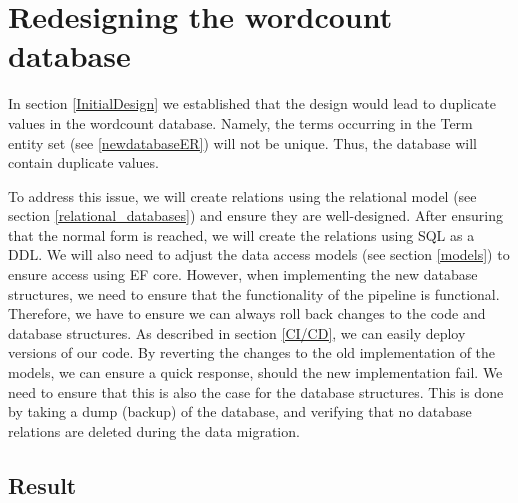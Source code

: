\section{Redesigning the wordcount database}
In section \ref{InitialDesign} we established that the design would lead to duplicate values in the wordcount database.
Namely, the terms occurring in the Term entity set (see \ref{newdatabaseER}) will not be unique. 
Thus, the database will contain duplicate values.
 
To address this issue, we will create relations using the relational model (see section \ref{relational_databases}) and ensure they are well-designed.
After ensuring that the normal form is reached, we will create the relations using SQL as a DDL.
We will also need to adjust the data access models (see section \ref{models}) to ensure access using EF core. However, when implementing the new database structures, we need to ensure that the functionality of the pipeline is functional. 
Therefore, we have to ensure we can always roll back changes to the code and database structures.
As described in section \ref{CI/CD}, we can easily deploy versions of our code. By reverting the changes to the old implementation of the models, we can ensure a quick response, should the new implementation fail.
We need to ensure that this is also the case for the database structures. 
This is done by taking a dump (backup) of the database, and verifying that no database relations are deleted during the data migration.




\subsection{Result}
